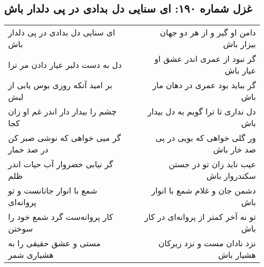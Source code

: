 \begin{center}
\section*{غزل شماره ۱۹۰: ای سنایی دل بدادی در پی دلدار باش}
\label{sec:190}
\begin{longtable}{l p{0.5cm} r}
ای سنایی دل بدادی در پی دلدار باش
&&
دامن او گیر و از هر دو جهان بیزار باش
\\
دل به دست دلبر عیار دادن مر ترا
&&
گر نبود از عمری اندر عشق او عیار باش
\\
بر امید آنکه روزی بوس یابی از لبش
&&
گر بباید بود عمری در دهان مار باش
\\
چشم را بیدار دار اندر غم او زان کجا
&&
دل نداری تا ترا گویم به دل بیدار باش
\\
گر میی خواهی که نوشی صبر کن در صد خمار
&&
ور گلی خواهی که بویی در پی صد خار باش
\\
گر نیابی خضروار آب حیات اندر ظلم
&&
عیب ناید زان تو در جستن سکندروار باش
\\
شمع با انوار جانانست و تو پروانه‌ای
&&
دشمن جان و غلام شمع با انوار باش
\\
کار پروانه‌ست گرد شمع خود را سوختن
&&
تو نه آخر کمتر از پروانه‌ای در کار باش
\\
مستی و عشق حقیقی را به هشیاری شمر
&&
نزد نادان مست و نزد زیرکان هشیار باش
\\
\end{longtable}
\end{center}
